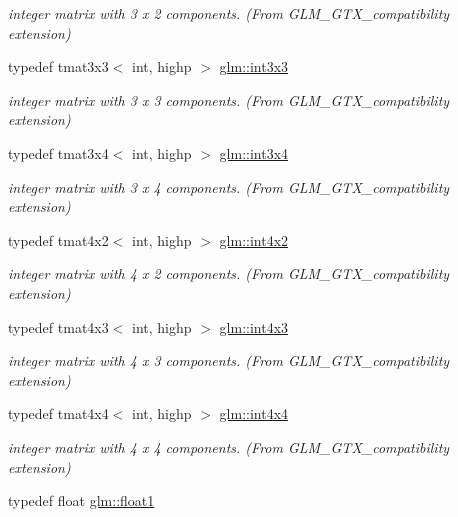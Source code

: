 \begin{DoxyCompactItemize}
\begin{DoxyCompactList}\small\item\em integer matrix with 3 x 2 components. (From G\+L\+M\+\_\+\+G\+T\+X\+\_\+compatibility extension) \end{DoxyCompactList}\item 
typedef tmat3x3$<$ int, highp $>$ \hyperlink{group__gtx__compatibility_ga4eb54b9ea96f12c04faaf2ca7b7c8c70}{glm\+::int3x3}
\begin{DoxyCompactList}\small\item\em integer matrix with 3 x 3 components. (From G\+L\+M\+\_\+\+G\+T\+X\+\_\+compatibility extension) \end{DoxyCompactList}\item 
typedef tmat3x4$<$ int, highp $>$ \hyperlink{group__gtx__compatibility_ga7500192cce87fb3a48f7119d6646af5a}{glm\+::int3x4}
\begin{DoxyCompactList}\small\item\em integer matrix with 3 x 4 components. (From G\+L\+M\+\_\+\+G\+T\+X\+\_\+compatibility extension) \end{DoxyCompactList}\item 
typedef tmat4x2$<$ int, highp $>$ \hyperlink{group__gtx__compatibility_ga91c24f1a2df5d20ea98f97ec243782c3}{glm\+::int4x2}
\begin{DoxyCompactList}\small\item\em integer matrix with 4 x 2 components. (From G\+L\+M\+\_\+\+G\+T\+X\+\_\+compatibility extension) \end{DoxyCompactList}\item 
typedef tmat4x3$<$ int, highp $>$ \hyperlink{group__gtx__compatibility_ga08b035f86b94428f5913e48a4a074e97}{glm\+::int4x3}
\begin{DoxyCompactList}\small\item\em integer matrix with 4 x 3 components. (From G\+L\+M\+\_\+\+G\+T\+X\+\_\+compatibility extension) \end{DoxyCompactList}\item 
typedef tmat4x4$<$ int, highp $>$ \hyperlink{group__gtx__compatibility_ga1e72ab0f7e57aae3d07ef8880c11d8b7}{glm\+::int4x4}
\begin{DoxyCompactList}\small\item\em integer matrix with 4 x 4 components. (From G\+L\+M\+\_\+\+G\+T\+X\+\_\+compatibility extension) \end{DoxyCompactList}\item 
typedef float \hyperlink{group__gtx__compatibility_gae0ad1b0450320cda98bbbecb56bc3167}{glm\+::float1}

\end{DoxyCompactItemize}
